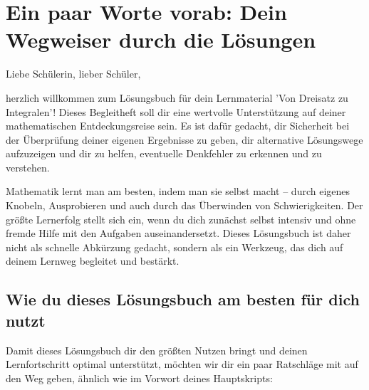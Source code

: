 
\section{Ein paar Worte vorab: Dein Wegweiser durch die Lösungen}
\label{sec:vorwort_loesungsbuch}

Liebe Schülerin, lieber Schüler,

herzlich willkommen zum Lösungsbuch für dein Lernmaterial 'Von Dreisatz zu Integralen'! Dieses Begleitheft soll dir eine wertvolle Unterstützung auf deiner mathematischen Entdeckungsreise sein. Es ist dafür gedacht, dir Sicherheit bei der Überprüfung deiner eigenen Ergebnisse zu geben, dir alternative Lösungswege aufzuzeigen und dir zu helfen, eventuelle Denkfehler zu erkennen und zu verstehen.

Mathematik lernt man am besten, indem man sie selbst macht – durch eigenes Knobeln, Ausprobieren und auch durch das Überwinden von Schwierigkeiten. Der größte Lernerfolg stellt sich ein, wenn du dich zunächst selbst intensiv und ohne fremde Hilfe mit den Aufgaben auseinandersetzt.  Dieses Lösungsbuch ist daher nicht als schnelle Abkürzung gedacht, sondern als ein Werkzeug, das dich auf deinem Lernweg begleitet und bestärkt.

\subsection*{Wie du dieses Lösungsbuch am besten für dich nutzt}

Damit dieses Lösungsbuch dir den größten Nutzen bringt und deinen Lernfortschritt optimal unterstützt, möchten wir dir ein paar Ratschläge mit auf den Weg geben, ähnlich wie im Vorwort deines Hauptskripts:        

